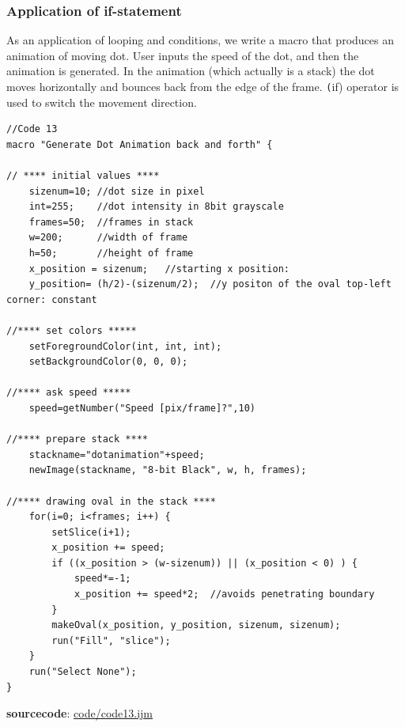 \documentclass[11pt,a4paper,oneside]{report}
\newcommand{\ilcom}[1]{\texttt{\small#1}}
\begin{document}
\subsubsection{Application of if-statement}
\label{sec:dotmove}

As an application of looping and conditions, we write a macro that produces an animation of moving dot. User inputs the speed of the dot, and then the animation is generated. 
In the animation (which actually is a stack) the dot moves horizontally and bounces back from the edge
of the frame. 
\ilcom(if) operator is used to switch the movement direction.

\begin{lstlisting}[morekeywords={*, setForegroundColor, setBackgroundColor, if}]
//Code 13
macro "Generate Dot Animation back and forth" {

// **** initial values ****
	sizenum=10;	//dot size in pixel
	int=255;	//dot intensity in 8bit grayscale
	frames=50;	//frames in stack
	w=200;		//width of frame 
	h=50;		//height of frame 
	x_position = sizenum;	//starting x position: 
	y_position= (h/2)-(sizenum/2);	//y positon of the oval top-left corner: constant

//**** set colors *****
	setForegroundColor(int, int, int);
	setBackgroundColor(0, 0, 0);

//**** ask speed *****
	speed=getNumber("Speed [pix/frame]?",10)

//**** prepare stack ****
	stackname="dotanimation"+speed;	
	newImage(stackname, "8-bit Black", w, h, frames);

//**** drawing oval in the stack ****
	for(i=0; i<frames; i++) {
		setSlice(i+1);
		x_position += speed;
		if ((x_position > (w-sizenum)) || (x_position < 0) ) { 
			speed*=-1;
			x_position += speed*2;  //avoids penetrating boundary
		}
		makeOval(x_position, y_position, sizenum, sizenum);
		run("Fill", "slice");
	}
	run("Select None");
}

\end{lstlisting}
\textbf{sourcecode}: \href{http://www.example.com/contents}{code/code13.ijm}
\end{document}

